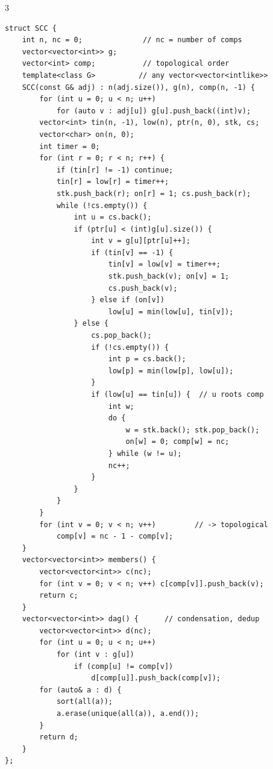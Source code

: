 \documentclass[9pt,a4paper]{extarticle}
\begin{document}
\begin{multicols*}{3}
\begin{lstlisting}
struct SCC {
    int n, nc = 0;              // nc = number of comps
    vector<vector<int>> g;
    vector<int> comp;           // topological order
    template<class G>          // any vector<vector<intlike>>
    SCC(const G& adj) : n(adj.size()), g(n), comp(n, -1) {
        for (int u = 0; u < n; u++)
            for (auto v : adj[u]) g[u].push_back((int)v);
        vector<int> tin(n, -1), low(n), ptr(n, 0), stk, cs;
        vector<char> on(n, 0);
        int timer = 0;
        for (int r = 0; r < n; r++) {
            if (tin[r] != -1) continue;
            tin[r] = low[r] = timer++;
            stk.push_back(r); on[r] = 1; cs.push_back(r);
            while (!cs.empty()) {
                int u = cs.back();
                if (ptr[u] < (int)g[u].size()) {
                    int v = g[u][ptr[u]++];
                    if (tin[v] == -1) {
                        tin[v] = low[v] = timer++;
                        stk.push_back(v); on[v] = 1;
                        cs.push_back(v);
                    } else if (on[v])
                        low[u] = min(low[u], tin[v]);
                } else {
                    cs.pop_back();
                    if (!cs.empty()) {
                        int p = cs.back();
                        low[p] = min(low[p], low[u]);
                    }
                    if (low[u] == tin[u]) {  // u roots comp
                        int w;
                        do {
                            w = stk.back(); stk.pop_back();
                            on[w] = 0; comp[w] = nc;
                        } while (w != u);
                        nc++;
                    }
                }
            }
        }
        for (int v = 0; v < n; v++)         // -> topological
            comp[v] = nc - 1 - comp[v];
    }
    vector<vector<int>> members() {
        vector<vector<int>> c(nc);
        for (int v = 0; v < n; v++) c[comp[v]].push_back(v);
        return c;
    }
    vector<vector<int>> dag() {      // condensation, dedup
        vector<vector<int>> d(nc);
        for (int u = 0; u < n; u++)
            for (int v : g[u])
                if (comp[u] != comp[v])
                    d[comp[u]].push_back(comp[v]);
        for (auto& a : d) {
            sort(all(a));
            a.erase(unique(all(a)), a.end());
        }
        return d;
    }
};
\end{lstlisting}


\end{multicols*}
\end{document}
